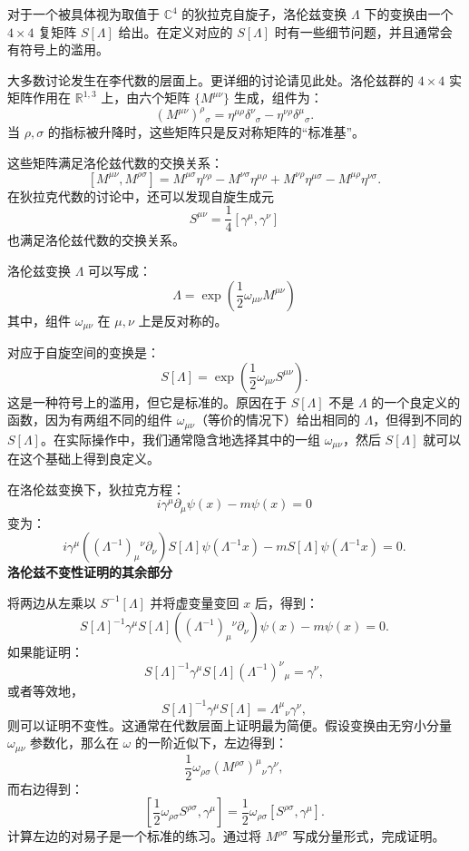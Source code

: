 对于一个被具体视为取值于 \( \mathbb{C}^4 \) 的狄拉克自旋子，洛伦兹变换 \( \Lambda \) 下的变换由一个 \( 4 \times 4 \) 复矩阵 \( S[\Lambda] \) 给出。在定义对应的 \( S[\Lambda] \) 时有一些细节问题，并且通常会有符号上的滥用。

大多数讨论发生在李代数的层面上。更详细的讨论请见此处。洛伦兹群的 \( 4 \times 4 \) 实矩阵作用在 \( \mathbb{R}^{1,3} \) 上，由六个矩阵 \( \{M^{\mu \nu}\} \) 生成，组件为：
\[
(M^{\mu \nu})^{\rho}{}_{\sigma} = \eta^{\mu \rho} \delta^{\nu}{}_{\sigma} - \eta^{\nu \rho} \delta^{\mu}{}_{\sigma}.~
\]
当 \( \rho, \sigma \) 的指标被升降时，这些矩阵只是反对称矩阵的“标准基”。

这些矩阵满足洛伦兹代数的交换关系：
\[
[M^{\mu \nu}, M^{\rho \sigma}] = M^{\mu \sigma} \eta^{\nu \rho} - M^{\nu \sigma} \eta^{\mu \rho} + M^{\nu \rho} \eta^{\mu \sigma} - M^{\mu \rho} \eta^{\nu \sigma}.~
\]
在狄拉克代数的讨论中，还可以发现自旋生成元
\[
S^{\mu \nu} = \frac{1}{4} [\gamma^{\mu}, \gamma^{\nu}]~
\]
也满足洛伦兹代数的交换关系。

洛伦兹变换 \( \Lambda \) 可以写成：
\[
\Lambda = \exp\left(\frac{1}{2} \omega_{\mu \nu} M^{\mu \nu}\right)~
\]
其中，组件 \( \omega_{\mu \nu} \) 在 \( \mu, \nu \) 上是反对称的。

对应于自旋空间的变换是：
\[
S[\Lambda] = \exp\left(\frac{1}{2} \omega_{\mu \nu} S^{\mu \nu}\right).~
\]
这是一种符号上的滥用，但它是标准的。原因在于 \( S[\Lambda] \) 不是 \( \Lambda \) 的一个良定义的函数，因为有两组不同的组件 \( \omega_{\mu \nu} \)（等价的情况下）给出相同的 \( \Lambda \)，但得到不同的 \( S[\Lambda] \)。在实际操作中，我们通常隐含地选择其中的一组 \( \omega_{\mu \nu} \)，然后 \( S[\Lambda] \) 就可以在这个基础上得到良定义。

在洛伦兹变换下，狄拉克方程：
\[
i \gamma^\mu \partial_\mu \psi(x) - m \psi(x) = 0~
\]
变为：
\[
i \gamma^\mu \left( (\Lambda^{-1})_{\mu}{}^{\nu} \partial_\nu \right) S[\Lambda] \psi(\Lambda^{-1} x) - m S[\Lambda] \psi(\Lambda^{-1} x) = 0.~
\]
\textbf{洛伦兹不变性证明的其余部分}

将两边从左乘以 \( S^{-1}[\Lambda] \) 并将虚变量变回 \( x \) 后，得到：
\[
S[\Lambda]^{-1} \gamma^\mu S[\Lambda] \left( (\Lambda^{-1})_{\mu}{}^{\nu} \partial_\nu \right) \psi(x) - m \psi(x) = 0.~
\]
如果能证明：
\[
S[\Lambda]^{-1} \gamma^\mu S[\Lambda] (\Lambda^{-1})^{\nu}{}_{\mu} = \gamma^\nu,~
\]
或者等效地，
\[
S[\Lambda]^{-1} \gamma^\mu S[\Lambda] = \Lambda^{\mu}{}_{\nu} \gamma^\nu,~
\]
则可以证明不变性。这通常在代数层面上证明最为简便。假设变换由无穷小分量 \( \omega_{\mu \nu} \) 参数化，那么在 \( \omega \) 的一阶近似下，左边得到：
\[
\frac{1}{2} \omega_{\rho \sigma} (M^{\rho \sigma})^{\mu}{}_{\nu} \gamma^\nu,~
\]
而右边得到：
\[
\left[ \frac{1}{2} \omega_{\rho \sigma} S^{\rho \sigma}, \gamma^\mu \right] = \frac{1}{2} \omega_{\rho \sigma} \left[ S^{\rho \sigma}, \gamma^\mu \right].~
\]
计算左边的对易子是一个标准的练习。通过将 \( M^{\rho \sigma} \) 写成分量形式，完成证明。

